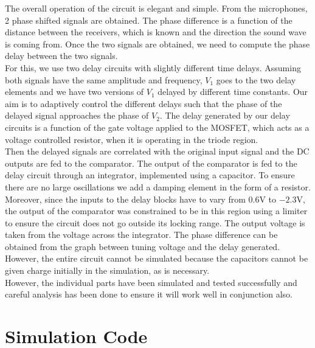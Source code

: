 \documentclass[]{risa}
\begin{document}
The overall operation of the circuit is elegant and simple. From the microphones, 2 phase shifted signals are obtained. The phase difference is a function of the distance between the receivers, which is known and the direction the sound wave is coming from. Once the two signals are obtained, we need to compute the phase delay between the two signals. \\
For this, we use two delay circuits with slightly different time delays. Assuming both signals have the same amplitude and frequency, $V_{1}$ goes to the two delay elements and we have two versions of $V_{1}$ delayed by different time constants. Our aim is to adaptively control the different delays such that the phase of the delayed signal approaches the phase of $V_{2}$. The delay generated by our delay circuits is a function of the gate voltage applied to the MOSFET, which acts as a voltage controlled resistor, when it is operating in the triode region. \\
Then the delayed signals are correlated with the original input signal and the DC outputs are fed to the comparator. The output of the comparator is fed to the delay circuit through an integrator, implemented using a capacitor. To ensure there are no large oscillations we add a damping element in the form of a resistor.
Moreover, since the inputs to the delay blocks have to vary from 0.6V to $-2.3$V, the output of the comparator was constrained to be in this region using a limiter to ensure the circuit does not go outside its locking range. The output voltage is taken from the voltage across the integrator. The phase difference can be obtained from the graph between tuning voltage and the delay generated. However, the entire circuit cannot be simulated because the capacitors cannot be given charge initially in the simulation, as is necessary. \\
However, the individual parts have been simulated and tested successfully and careful analysis has been done to ensure it will work well in conjunction also. 




\appendices
\renewcommand{\thesection}{\Alph{section}}
\setcounter{section}{0}
\section{Simulation Code}

	\begin{minipage}{\columnwidth}
		
		\label{delay_code}
	\end{minipage}
	
\end{document}
